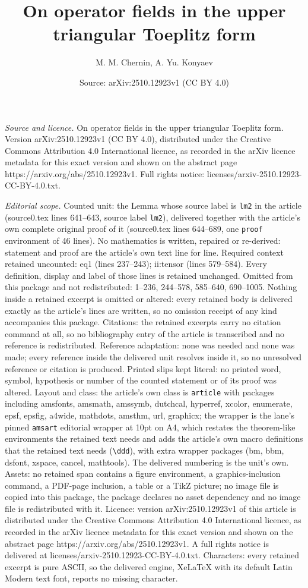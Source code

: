 \documentclass[10pt,a4paper]{amsart}
\title[On operator fields in the upper triangular Toeplitz form]{On operator fields in the upper triangular Toeplitz form}
\author{M. M. Chernin, A. Yu. Konyaev}
\date{Source: arXiv:2510.12923v1 (CC BY 4.0)}
\begin{document}
\maketitle

\noindent\emph{Source and licence.} On operator fields in the upper triangular Toeplitz form. Version arXiv:2510.12923v1 (CC BY 4.0), distributed under the Creative Commons Attribution 4.0 International licence, as recorded in the arXiv licence metadata for this exact version and shown on the abstract page https://arxiv.org/abs/2510.12923v1. Full rights notice: licenses/arxiv-2510.12923-CC-BY-4.0.txt.\par\smallskip

\noindent\textit{Editorial scope.} Counted unit: the Lemma whose source label is \texttt{lm2} in the article (source0.tex lines 641--643, source label \texttt{lm2}), delivered together with the article's own complete original proof of it (source0.tex lines 644--689, one \texttt{proof} environment of 46 lines). No mathematics is written, repaired or re-derived: statement and proof are the article's own text line for line. Required context retained uncounted: eq1 (lines 237--243); ii:tensor (lines 579--584). Every definition, display and label of those lines is retained unchanged. Omitted from this package and not redistributed: 1--236, 244--578, 585--640, 690--1005. Nothing inside a retained excerpt is omitted or altered: every retained body is delivered exactly as the article's lines are written, so no omission receipt of any kind accompanies this package. Citations: the retained excerpts carry no citation command at all, so no bibliography entry of the article is transcribed and no reference is redistributed. Reference adaptation: none was needed and none was made; every reference inside the delivered unit resolves inside it, so no unresolved reference or citation is produced. Printed slips kept literal: no printed word, symbol, hypothesis or number of the counted statement or of its proof was altered. Layout and class: the article's own class is \texttt{article} with packages including amsfonts, amsmath, amssymb, dutchcal, hyperref, xcolor, enumerate, epsf, epsfig, a4wide, mathdots, amsthm, url, graphicx; the wrapper is the lane's pinned \texttt{amsart} editorial wrapper at 10pt on A4, which restates the theorem-like environments the retained text needs and adds the article's own macro definitions that the retained text needs (\texttt{\textbackslash ddd}), with extra wrapper packages (bm, bbm, dsfont, xspace, cancel, mathtools). The delivered numbering is the unit's own. Assets: no retained span contains a figure environment, a graphics-inclusion command, a PDF-page inclusion, a table or a TikZ picture; no image file is copied into this package, the package declares no asset dependency and no image file is redistributed with it. Licence: version arXiv:2510.12923v1 of this article is distributed under the Creative Commons Attribution 4.0 International licence, as recorded in the arXiv licence metadata for this exact version and shown on the abstract page https://arxiv.org/abs/2510.12923v1. A full rights notice is delivered at licenses/arxiv-2510.12923-CC-BY-4.0.txt. Characters: every retained excerpt is pure ASCII, so the delivered engine, XeLaTeX with its default Latin Modern text font, reports no missing character.
\end{document}
